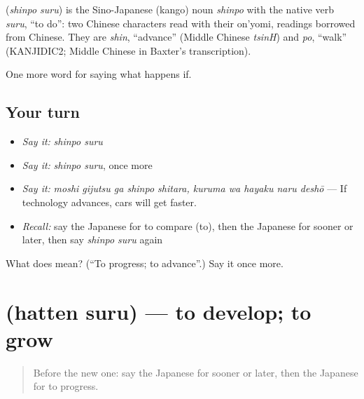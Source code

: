 \begin{cousinweb}
\textbf{} (\emph{shinpo suru}) is the Sino-Japanese (kango) noun \emph{shinpo} with the native verb \emph{suru}, \textquotedblleft{}to do\textquotedblright{}: two Chinese characters read with their on'yomi, readings borrowed from Chinese. They are \emph{shin}, \textquotedblleft{}advance\textquotedblright{} (Middle Chinese \emph{tsinH}) and \emph{po}, \textquotedblleft{}walk\textquotedblright{} (KANJIDIC2; Middle Chinese in Baxter's transcription).
\end{cousinweb}

\begin{grammarlens}[title={What you've built}]
One more word for saying what happens if.
\end{grammarlens}

\subsection*{Your turn}
\begin{itemize}
\raggedright
  \item \emph{Say it:} \emph{shinpo suru}
  \item \emph{Say it:} \emph{shinpo suru}, once more
  \item \emph{Say it:} \emph{moshi gijutsu ga shinpo shitara, kuruma wa hayaku naru deshō} — If technology advances, cars will get faster.
  \item \emph{Recall:} say the Japanese for to compare (to), then the Japanese for sooner or later, then say \emph{shinpo suru} again
\end{itemize}

\begin{tcolorbox}[breakable,colback=teal!4,colframe=teal!35!black,title={Before you move on}]
What does  mean? (\textquotedblleft{}To progress; to advance\textquotedblright{}.) Say it once more.
\end{tcolorbox}
\section[\texorpdfstring{\ja{はってんする} (hatten suru)}{はってんする (hatten suru)}]{ (hatten suru) — to develop; to grow}

\label{lesson:JA-C526-hatten-suru}



\begin{quote}
Before the new one: say the Japanese for sooner or later, then the Japanese for to progress.
\end{quote}

